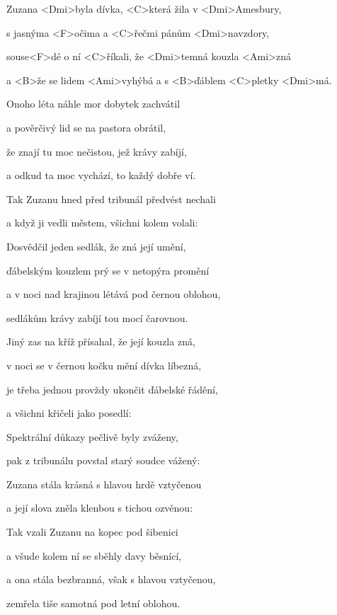 

\zs
Zuzana <Dmi>byla dívka, <C>která žila v <Dmi>Amesbury,

s jasnýma <F>očima a <C>řečmi pánům <Dmi>navzdory,

souse<F>dé o ní <C>říkali, že <Dmi>temná kouzla <Ami>zná

a <B>že se lidem <Ami>vyhýbá a s <B>ďáblem <C>pletky <Dmi>má.
\ks

\zs
Onoho léta náhle mor dobytek zachvátil

a pověrčivý lid se na pastora obrátil,

že znají tu moc nečistou, jež krávy zabíjí,

a odkud ta moc vychází, to každý dobře ví.
\ks

\zs
Tak Zuzanu hned před tribunál předvést nechali

a když ji vedli městem, všichni kolem volali:

\ks

\zs
Dosvědčil jeden sedlák, že zná její umění,

ďábelským kouzlem prý se v netopýra promění

a v noci nad krajinou létává pod černou oblohou,

sedlákům krávy zabíjí tou mocí čarovnou.
\ks

\zs
Jiný zas na kříž přísahal, že její kouzla zná,

v noci se v černou kočku mění dívka líbezná,

je třeba jednou provždy ukončit ďábelské řádění,

a všichni křičeli jako posedlí: 
\ks

\zs
Spektrální důkazy pečlivě byly zváženy,

pak z tribunálu povstal starý soudce vážený:

\ks

\zs
Zuzana stála krásná s hlavou hrdě vztyčenou

a její slova zněla klenbou s tichou ozvěnou:

\ks

\zs
Tak vzali Zuzanu na kopec pod šibenici

a všude kolem ní se sběhly davy běsnící,

a ona stála bezbranná, však s hlavou vztyčenou,

zemřela tiše samotná pod letní oblohou.
\ks

\kp
